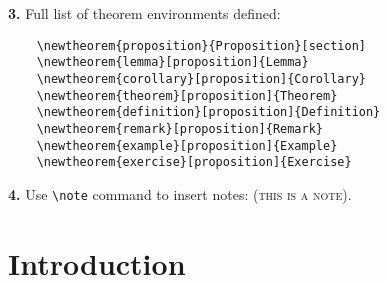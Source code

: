 \documentclass[letterpaper,11pt,oneside,reqno]{amsart}
\numberwithin{equation}{section}%
\newcommand{\note}[1]{\textsc{\color{blue}(#1)}}
\theoremstyle{definition}
\begin{document}
\textbf{3.} Full list of theorem environments defined:
\begin{lstlisting}
	\newtheorem{proposition}{Proposition}[section]
	\newtheorem{lemma}[proposition]{Lemma}
	\newtheorem{corollary}[proposition]{Corollary}
	\newtheorem{theorem}[proposition]{Theorem}
	\newtheorem{definition}[proposition]{Definition}
	\newtheorem{remark}[proposition]{Remark}
	\newtheorem{example}[proposition]{Example}
	\newtheorem{exercise}[proposition]{Exercise}	
\end{lstlisting}

\textbf{4.} Use \lstinline{\note} command to insert notes: \note{this is a note}.

\section{Introduction} %
\label{sec:introduction}










\end{document}

